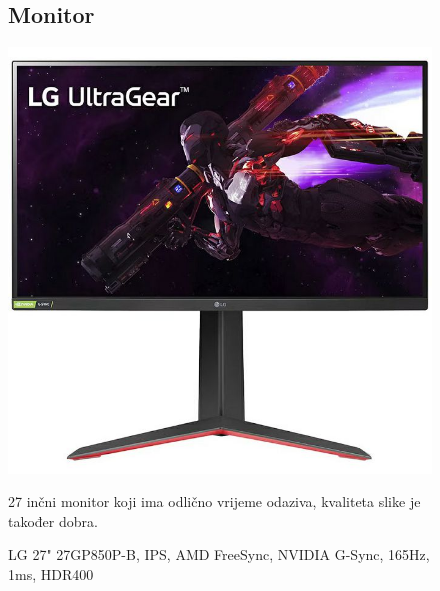 \documentclass{article}
\begin{document}
\begin{figure}[H]
\subsection{Monitor}
\centering
\includegraphics[scale=0.3]{Slike/mon.jpg}
\caption{LG 27" 27GP850P-B, IPS, AMD FreeSync, NVIDIA G-Sync, 165Hz, 1ms, HDR400}
27 inčni monitor koji ima odlično vrijeme odaziva, kvaliteta slike je također dobra.
\end{figure}
\end{document}
